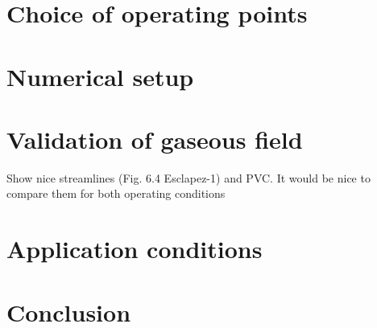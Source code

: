 \section{Choice of operating points}

\section{Numerical setup}

\section{Validation of gaseous field}

Show nice streamlines (Fig. 6.4 Esclapez-1) and PVC. It would be nice to compare them for both operating conditions

\section{Application conditions}

\section{Conclusion}

%
%
%
%
%
